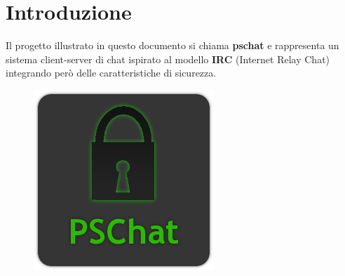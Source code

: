 \section*{Introduzione}  \thispagestyle{plain}
Il progetto illustrato in questo documento si chiama \textbf{pschat} e rappresenta un sistema client-server di chat ispirato al modello \textbf{IRC} (Internet Relay Chat) integrando però delle caratteristiche di sicurezza.
\begin{figure}[H]
  \centering \includegraphics[scale=0.35]{../data/psc.png}
\end{figure}
\newpage
